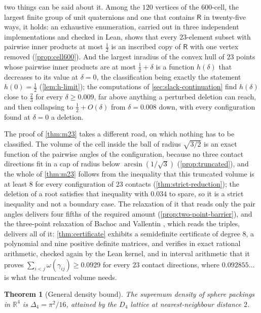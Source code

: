 \documentclass[11pt,reqno]{amsart}
\renewcommand{\_}{\origunderscore\allowbreak}
\numberwithin{equation}{section}
\theoremstyle{plain}
\newtheorem{thm}{Theorem}[section]
\theoremstyle{definition}
\theoremstyle{remark}
\newcommand{\Rt}{\mathsf{R}}                 %
\begin{document}
two things can be said about it. Among the $120$ vertices of the $600$-cell, the largest
finite group of unit quaternions and one that contains $\Rt$ in
twenty-five ways, it holds: an exhaustive enumeration, carried out in
three independent implementations and checked in Lean, shows that every
$23$-element subset with pairwise inner products at most $\tfrac12$ is
an inscribed copy of $\Rt$ with one vertex removed
(\cref{prop:cell600}). And the largest inradius of the convex hull of
$23$ points whose pairwise inner products are at most $\tfrac12+\delta$
is a function $h(\delta)$ that decreases to its value at $\delta=0$, the
classification being exactly the statement $h(0)=\tfrac12$
(\cref{lem:h-limit}); the computations of \cref{sec:slack-continuation}
find $h(\delta)$ close to $\tfrac{2}{3}$ for every $\delta\ge0.009$, far
above anything a perturbed deletion can reach, and then collapsing to
$\tfrac12+O(\delta)$ from $\delta=0.008$ down, with every configuration
found at $\delta=0$ a deletion.

The proof of \cref{thm:m23} takes a different road, on which nothing
has to be classified. The volume of the cell inside the ball of radius
$\sqrt{3/2}$ is an exact function of the pairwise angles of the
configuration, because no three contact directions fit in a cap of
radius below $\arcsin(1/\sqrt3)$ (\cref{prop:truncated}), and the whole
of \cref{thm:m23} follows from the inequality that this truncated volume
is at least $8$ for every configuration of $23$ contacts
(\cref{thm:strict-reduction}); the deletion of a root satisfies that
inequality with $0.034$ to spare, so it is a strict inequality and not
a boundary case. The relaxation of it that reads only the pair angles
delivers four fifths of the required amount
(\cref{prop:two-point-barrier}), and the three-point relaxation of
Bachoc and Vallentin \cite{BV08}, which reads the triples, delivers all
of it: \cref{thm:certificate} exhibits a semidefinite certificate of
degree $8$, a polynomial and nine positive definite matrices, and
verifies in exact rational arithmetic, checked again by the Lean kernel,
and in interval arithmetic that it proves
$\sum_{i<j}\omega(\gamma_{ij})\ge0.0929$ for every $23$ contact
directions, where $0.092855\ldots$ is what the truncated volume needs.

\begin{thm}[General density bound]\label{thm:main-general}
The supremum density of sphere packings in $\mathbb{R}^4$ is
$\Delta_4=\pi^2/16$, attained by the $D_4$ lattice at nearest-neighbour
distance $2$.
\end{thm}
\end{document}
